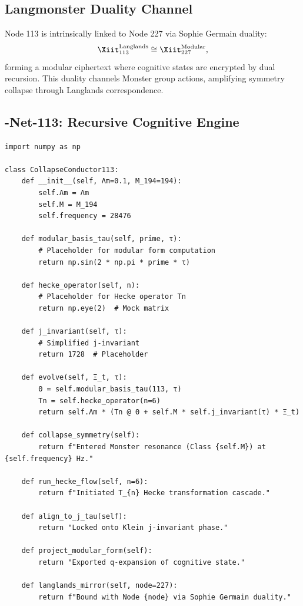 \documentclass[12pt]{article}
\begin{document}
\subsection{Langmonster Duality Channel}
Node 113 is intrinsically linked to Node 227 via Sophie Germain duality:
\[
\Xiit_{113}^{\text{Langlands}} \cong \Xiit_{227}^{\text{Modular}},
\]
forming a modular ciphertext where cognitive states are encrypted by dual recursion. This duality channels Monster group actions, amplifying symmetry collapse through Langlands correspondence.

\subsection{\Xiit-Net-113: Recursive Cognitive Engine}
\begin{algorithm}
\caption{CollapseConductor113}
\begin{lstlisting}
import numpy as np

class CollapseConductor113:
    def __init__(self, Λm=0.1, M_194=194):
        self.Λm = Λm
        self.M = M_194
        self.frequency = 28476

    def modular_basis_tau(self, prime, τ):
        # Placeholder for modular form computation
        return np.sin(2 * np.pi * prime * τ)

    def hecke_operator(self, n):
        # Placeholder for Hecke operator Tn
        return np.eye(2)  # Mock matrix

    def j_invariant(self, τ):
        # Simplified j-invariant
        return 1728  # Placeholder

    def evolve(self, Ξ_t, τ):
        Θ = self.modular_basis_tau(113, τ)
        Tn = self.hecke_operator(n=6)
        return self.Λm * (Tn @ Θ + self.M * self.j_invariant(τ) * Ξ_t)

    def collapse_symmetry(self):
        return f"Entered Monster resonance (Class {self.M}) at {self.frequency} Hz."

    def run_hecke_flow(self, n=6):
        return f"Initiated T_{n} Hecke transformation cascade."

    def align_to_j_tau(self):
        return "Locked onto Klein j-invariant phase."

    def project_modular_form(self):
        return "Exported q-expansion of cognitive state."

    def langlands_mirror(self, node=227):
        return f"Bound with Node {node} via Sophie Germain duality."
\end{lstlisting}
\end{algorithm}
\end{document}
